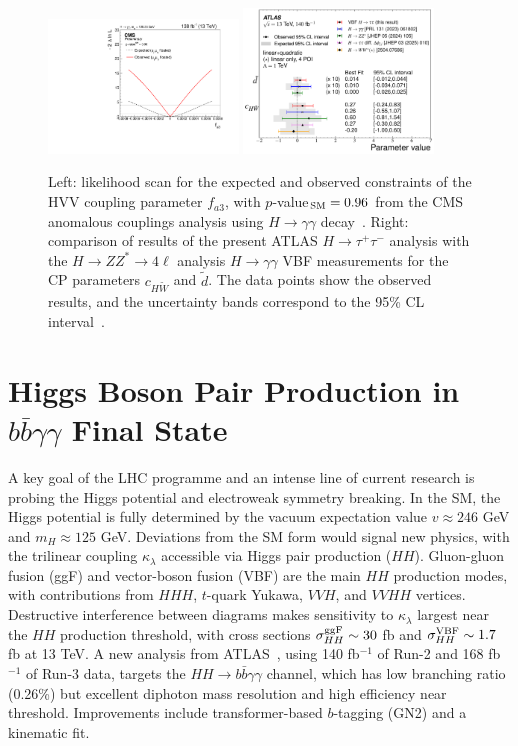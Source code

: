\documentclass[a4paper,11pt]{article}
\begin{document}
\begin{figure}[!htbp]
\centering
\includegraphics[width=0.45\textwidth]{fa3-cms}
\includegraphics[width=0.45\textwidth]{httcp-atlas}
\caption
    {Left: likelihood scan for the expected and observed constraints
      of the HVV coupling parameter $f_{a3}$, with $p$-value$_{\rm SM}
      = 0.96$ from the CMS anomalous couplings analysis using
      $H\to\gamma\gamma$ decay~\cite{hggac-cms}. Right: comparison of
      results of the present ATLAS $H\to\tau^+\tau^-$ analysis with the $H\to
      ZZ^*\to 4\ell$ analysis $H\to\gamma\gamma$ VBF measurements for
      the CP parameters $c_{H\tilde{W}}$ and $\tilde{d}$.  The data
      points show the observed results, and the uncertainty bands
      correspond to the 95\% CL
      interval~\cite{httcp-atlas}.\label{fig:cp}
    }
\end{figure}


\section{Higgs Boson Pair Production in $b\bar{b}\gamma\gamma$ Final State}

A key goal of the LHC programme and an intense line of current
research is probing the Higgs potential and electroweak symmetry
breaking.  In the SM, the Higgs potential is fully determined by the
vacuum expectation value $v\approx246$ GeV and $m_H\approx125$ GeV.
Deviations from the SM form would signal new physics, with the
trilinear coupling $\kappa_\lambda$ accessible via Higgs pair
production ($HH$).  Gluon-gluon fusion (ggF) and vector-boson fusion
(VBF) are the main $HH$ production modes, with contributions from
$HHH$, $t$-quark Yukawa, $VVH$, and $VVHH$ vertices.  Destructive
interference between diagrams makes sensitivity to $\kappa_\lambda$
largest near the $HH$ production threshold, with cross sections
$\sigma_{HH}^{\rm ggF}\sim30$ fb and $\sigma_{HH}^{\rm VBF}\sim1.7$ fb
at 13 TeV.  A new analysis from ATLAS~\cite{hhbbgg-atlas}, using 140
fb$^{-1}$ of Run-2 and 168 fb$^{-1}$ of Run-3 data, targets the $HH\to
b\bar{b}\gamma\gamma$ channel, which has low branching ratio (0.26\%)
but excellent diphoton mass resolution and high efficiency near
threshold.  Improvements include transformer-based $b$-tagging (GN2)
and a kinematic fit.
\end{document}
